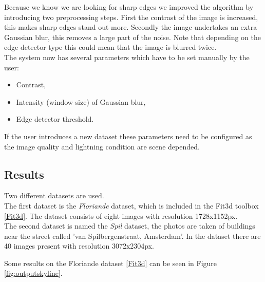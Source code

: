 Because we know we are looking for sharp edges we improved the algorithm by
introducing two preprocessing steps. First the contrast of the image is
increased, this makes sharp edges stand out more.  Secondly the image undertakes
an extra Gaussian blur, this removes a large part of the noise. Note that
depending on the edge detector type this could mean that the image is blurred
twice.\\


The system now has several parameters which have to be set manually by the user:
\begin{itemize}
	\item Contrast,
	\item Intensity (window size) of Gaussian blur,
	\item Edge detector threshold.
\end{itemize}

If the user introduces a new dataset these parameters need to be configured
as the image quality and lightning condition are scene depended.


\subsection{Results}%
Two different datasets are used. \\
The first dataset is the \emph{Floriande} dataset, which is included in the Fit3d toolbox \ref{Fit3d}. The dataset consists of eight images with resolution 1728x1152px.\\
The second dataset is named the \emph{Spil} dataset, the photos are taken of buildings near the street called 'van Spilbergenstraat, Amsterdam'.
In the dataset there are 40 images present with resolution 3072x2304px.


Some results on the Floriande dataset \ref{Fit3d}%
 can be seen in Figure \ref{fig:outputskyline}.



